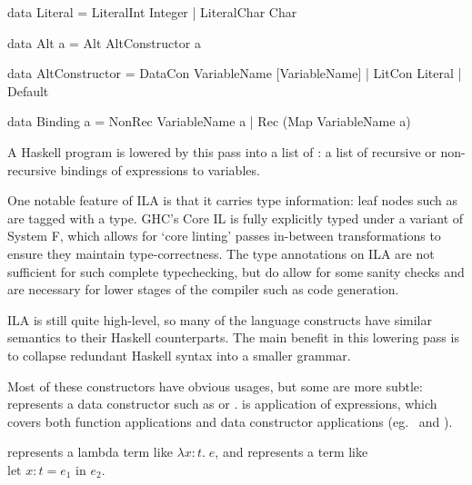 \documentclass[dissertation.tex]{subfiles}
\begin{document}
{{{\begin{haskellfigure}
            data Literal = LiteralInt Integer
                         | LiteralChar Char

            data Alt a = Alt AltConstructor a

            data AltConstructor = DataCon VariableName [VariableName]
                                | LitCon Literal
                                | Default

            data Binding a = NonRec VariableName a
                           | Rec (Map VariableName a)
            \end{haskellfigure}

            A Haskell program is lowered by this pass into a list of : a list of recursive or
            non-recursive bindings of expressions to variables.


            One notable feature of ILA is that it carries type information: leaf nodes such as  are
            tagged with a type. GHC's Core IL is fully explicitly typed under a variant of System F, which allows for
            `core linting' passes in-between transformations to ensure they maintain type-correctness. The type
            annotations on ILA are not sufficient for such complete typechecking, but do allow for some sanity checks
            and are necessary for lower stages of the compiler such as code generation. 

            ILA is still quite high-level, so many of the language constructs have similar semantics to their Haskell
            counterparts. The main benefit in this lowering pass is to collapse redundant Haskell syntax into a smaller
            grammar.

            Most of these constructors have obvious usages, but some are more subtle:  represents a data
            constructor such as  or .  is application of expressions, which
            covers both function applications and data constructor applications (eg.\  and ).

             represents a lambda term like \(\lambda x : t.\;e\), and  represents a term like \(\text{let } x:t = e_1 \text{ in } e_2\).

}}}
\end{document}
